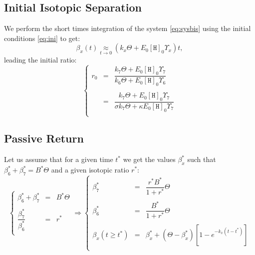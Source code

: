 \documentclass[aps,onecolumn,11pt]{revtex4}
\newcommand{\mychem}[1]{\mathtt{#1}}
\newcommand{\myconc}[1]{\left\lbrack{#1}\right\rbrack}
\newcommand{\spproton}{\mychem{H}}
\newcommand{\proton}{\myconc{\spproton}}
\newcommand{\start}{\ast}
\begin{document}
\subsection{Initial Isotopic Separation}
We perform the short times integration of the system \eqref{eq:sysbis} using the initial
conditions \eqref{eq:ini} to get:
\begin{equation}
\beta_x(t) \underset{t\to0}{\approx} \left(k_x \Theta + E_0 \proton_0 \Upsilon_x\right) t,
\end{equation}
leading the initial ratio:
\begin{equation}
\label{eq:r0}
\left\lbrace
\begin{array}{rcl}
r_0 & = & \dfrac{k_7\Theta+E_0 \proton_0 \Upsilon_7}{k_6\Theta+E_0 \proton_0 \Upsilon_6}\\
	\\
    & = & \dfrac{k_7\Theta+E_0 \proton_0 \Upsilon_7}{ \sigma k_7\Theta+ \kappa E_0 \proton_0 \Upsilon_7}\\
\end{array}
\right.
\end{equation}

\subsection{Passive Return}
Let us assume that for a given time $t^\start$ we get the values $\beta_x^\start$ such that $\beta_6^\start+\beta_7^\start=B^\start\Theta$ and a given isotopic ratio $r^\start$:
\begin{equation}
\label{eq:start}
\left\lbrace
\begin{array}{rcl}
\beta_6^\start+\beta_7^\start & = & B^\start\Theta \\
\\
\dfrac{\beta_7^\start}{\beta_6^\start} & = & r^\start\\
\end{array}
\right.
\Rightarrow
\left\lbrace
\begin{array}{rcl}
\beta_7^\start & = & \dfrac{r^\start B^\start}{1+r^\start}\Theta\\
\\
\beta_6^\start & = & \dfrac{B^\start}{1+r^\start}\Theta\\
\\
\beta_x(t\geq t^\start) & = & \beta_x^\start + \left(\Theta-\beta_x^\start\right)\left[1-e^{-k_x(t-t^\start)}\right]\\
\end{array}
\right.
\end{equation}
\end{document}
